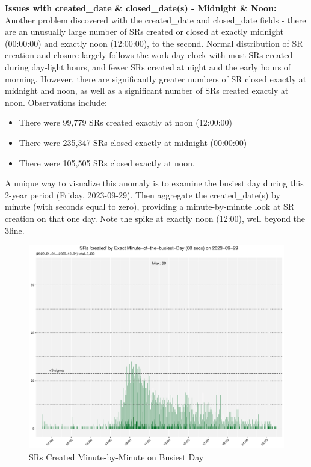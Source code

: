 \documentclass[linenumber]{jdsart}
\begin{document}
		
\label{sec:midnightandnoon}
\textbf{Issues with created\_date \& closed\_date(s) - Midnight \& Noon:} Another 
problem discovered with the created\_date and 
closed\_date fields - there are an unusually large number of SRs 
created or closed at exactly midnight (00:00:00) and exactly noon (12:00:00), 
to the second. Normal distribution of SR creation and closure 
largely follows the work-day clock with most  SRs created during 
day-light hours, and fewer SRs 	created at night and the early hours 
of morning. However, there are significantly greater numbers 
of SR closed exactly at midnight and noon, as well as a significant 
number of SRs created exactly at noon. Observations include:

	
\begin{itemize}
	 \item There were 99,779 SRs created exactly at noon (12:00:00)
	
	 \item There were 235,347 SRs closed exactly at midnight (00:00:00)
	 
	\item There were 105,505 SRs closed exactly at noon. 
\end{itemize}


A unique way to visualize this anomaly is to examine the busiest day 
during this 2-year period (Friday, 2023-09-29). Then aggregate 
the created\_date(s) by minute (with seconds equal to zero), providing
a minute-by-minute look at SR creation on that one day. Note the spike 
at exactly noon (12:00), well beyond the 3\textsigma line.

\begin{figure}[tbp]
	\centering
	\includegraphics[width=\textwidth]
	{2-year-trend_SR_created_by_minute_of_busiest_day.pdf}
	\caption{SRs Created Minute-by-Minute on Busiest Day}
	\label{fig:busiestcreated}
\end{figure}	
\end{document}
